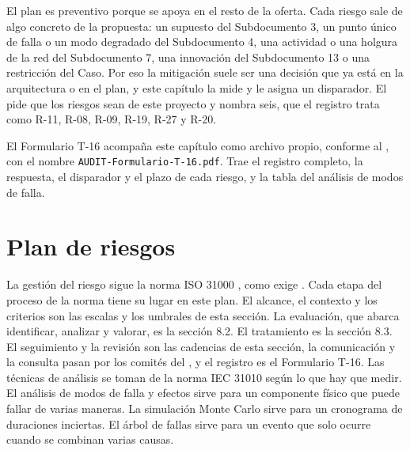 El plan es preventivo porque se apoya en el resto de la oferta. Cada riesgo sale de algo concreto de la
propuesta: un supuesto del Subdocumento 3, un punto único de falla o un modo degradado del
Subdocumento 4, una actividad o una holgura de la red del Subdocumento 7, una innovación del
Subdocumento 13 o una restricción del Caso. Por eso la mitigación suele ser una decisión que ya
está en la arquitectura o en el plan, y este capítulo la mide y le asigna un disparador. El  pide que los riesgos sean de este proyecto y nombra
seis, que el registro trata como R-11, R-08, R-09, R-19, R-27 y R-20.

El Formulario T-16 acompaña este capítulo como archivo propio, conforme al ,
con el nombre \texttt{AUDIT-Formulario-T-16.pdf}. Trae el registro completo, la respuesta, el
disparador y el plazo de cada riesgo, y la tabla del análisis de modos de falla.

\section{Plan de riesgos}\label{sec:8-plan}

La gestión del riesgo sigue la norma ISO 31000 \parencite{iso31000}, como exige .
Cada etapa del proceso de la norma tiene su lugar en este plan. El alcance, el contexto y los criterios
son las escalas y los umbrales de esta sección. La evaluación, que abarca identificar, analizar y valorar,
es la sección 8.2. El tratamiento es la sección 8.3. El seguimiento y la revisión son las cadencias de
esta sección, la comunicación y la consulta pasan por los comités del , y el registro es el
Formulario T-16. Las técnicas de análisis se toman de la norma IEC 31010 \parencite{iec31010} según lo
que hay que medir. El análisis de modos de falla y efectos \parencite{iec60812} sirve para un componente
físico que puede fallar de varias maneras. La simulación Monte Carlo sirve para un cronograma de
duraciones inciertas. El árbol de fallas \parencite{iec61025} sirve para un evento que solo ocurre
cuando se combinan varias causas.

